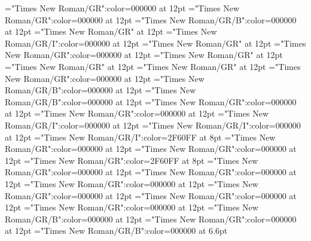 \documentclass[a4paper]{article}
\begin{document}
\pagestyle{plain}
\sloppy
\setlength{\parfillskip}{0pt plus 1fil}
\font\xitemtpi="Times New Roman/GR":color=000000 at 12pt
\font\xitembzhfonipa="Times New Roman/GR":color=000000 at 12pt
\font\xitemxitemheadwordbefore="Times New Roman/GR/B":color=000000 at 12pt
\font\xitemxitemexamplesbefore="Times New Roman/GR" at 12pt
\font\xitemxitemexamplebefore="Times New Roman/GR/I":color=000000 at 12pt
\font\xitemxitemslotsbefore="Times New Roman/GR" at 12pt
\font\entrydicBody="Times New Roman/GR":color=000000 at 12pt
\font{}="Times New Roman/GR" at 12pt
\font{}="Times New Roman/GR" at 12pt
\font{}="Times New Roman/GR" at 12pt
\font\entryletDatadicBody="Times New Roman/GR":color=000000 at 12pt
\font\headwordbzhentryletDatadicBody="Times New Roman/GR/B":color=000000 at 12pt
\font\headwordafterentryletDatadicBody="Times New Roman/GR/B":color=000000 at 12pt
\font\examplesentryletDatadicBody="Times New Roman/GR":color=000000 at 12pt
\font\examplesafterentryletDatadicBody="Times New Roman/GR":color=000000 at 12pt
\font\examplebzhexamplesentryletDatadicBody="Times New Roman/GR/I":color=000000 at 12pt
\font\exampleafterexamplesentryletDatadicBody="Times New Roman/GR/I":color=000000 at 12pt
\font\xlanguagetagenexamplebzhexamplesentryletDatadicBody="Times New Roman/GR/I":color=2F60FF at 8pt
\font\translationsexamplesentryletDatadicBody="Times New Roman/GR":color=000000 at 12pt
\font\translationentranslationsexamplesentryletDatadicBody="Times New Roman/GR":color=000000 at 12pt
\font\xlanguagetagentranslationentranslationsexamplesentryletDatadicBody="Times New Roman/GR":color=2F60FF at 8pt
\font\relationstranslationsexamplesentryletDatadicBody="Times New Roman/GR":color=000000 at 12pt
\font\xitemrelationstranslationsexamplesentryletDatadicBody="Times New Roman/GR":color=000000 at 12pt
\font\lexreftypeenxitemrelationstranslationsexamplesentryletDatadicBody="Times New Roman/GR":color=000000 at 12pt
\font\lexreftargetsxitemrelationstranslationsexamplesentryletDatadicBody="Times New Roman/GR":color=000000 at 12pt
\font\xitemlexreftargetsxitemrelationstranslationsexamplesentryletDatadicBody="Times New Roman/GR":color=000000 at 12pt
\font\sensecrossrefbzhxitemlexreftargetsxitemrelationstranslationsexamplesentryletDatadicBody="Times New Roman/GR":color=000000 at 12pt
\font\xsensenumberensensecrossrefbzhxitemlexreftargetsxitemrelationstranslationsexamplesentryletDatadicBody="Times New Roman/GR/B":color=000000 at 12pt
\font\xitemxitemexamplesbeforelexreftargetsxitemrelationstranslationsexamplesentryletDatadicBody="Times New Roman/GR":color=000000 at 12pt
\font\xhomographnumberbzhsensecrossrefbzhxitemlexreftargetsxitemrelationstranslationsexamplesentryletDatadicBody="Times New Roman/GR/B":color=000000 at 6.6pt
\end{document}
